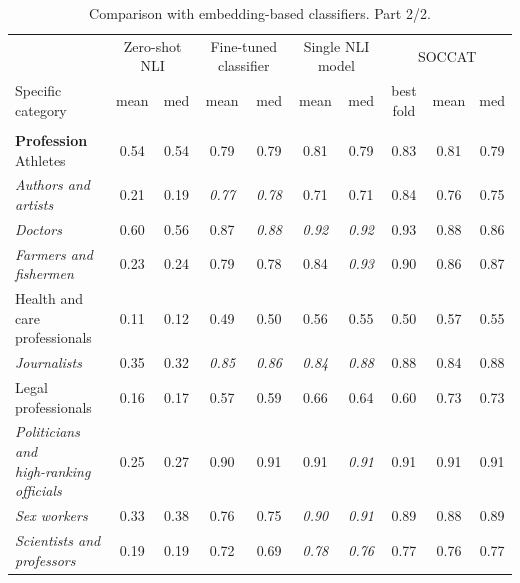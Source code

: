 \begin{table}[htb]
\centering
\renewcommand{\arraystretch}{0.9}
\scriptsize
\begin{threeparttable}
\caption{Comparison with embedding-based classifiers. Part 2/2.}
\label{tab:embedding_baselines_part2}
\begin{tabular}{l c c c c c c c c c}
\toprule
 & \multicolumn{2}{c}{Zero-shot NLI} & \multicolumn{2}{c}{Fine-tuned classifier} & \multicolumn{2}{c}{Single NLI model} & \multicolumn{3}{c}{SOCCAT} \\
\cmidrule(lr){2-3} \cmidrule(lr){4-5} \cmidrule(lr){6-7} \cmidrule(lr){8-10}
Specific category & \multicolumn{1}{c}{mean} & \multicolumn{1}{c}{med} & \multicolumn{1}{c}{mean} & \multicolumn{1}{c}{med} & \multicolumn{1}{c}{mean} & \multicolumn{1}{c}{med} & \multicolumn{1}{c}{best fold} & \multicolumn{1}{c}{mean} & \multicolumn{1}{c}{med} \\
\midrule
\rule{0pt}{5pt} &  &  &  &  &  &  &  &  &  \\
\shortstack[l]{\textbf{Profession}\\[3pt]Athletes} & 0.54 & 0.54 & 0.79 & 0.79 & 0.81 & 0.79 & 0.83 & 0.81 & 0.79 \\
\textit{Authors and artists} & 0.21 & 0.19 & \textit{0.77} & \textit{0.78} & 0.71 & 0.71 & 0.84 & 0.76 & 0.75 \\
\textit{Doctors} & 0.60 & 0.56 & 0.87 & \textit{0.88} & \textit{0.92} & \textit{0.92} & 0.93 & 0.88 & 0.86 \\
\textit{Farmers and fishermen} & 0.23 & 0.24 & 0.79 & 0.78 & 0.84 & \textit{0.93} & 0.90 & 0.86 & 0.87 \\
\shortstack[l]{Health and care\\[-3pt]professionals} & 0.11 & 0.12 & 0.49 & 0.50 & 0.56 & 0.55 & 0.50 & 0.57 & 0.55 \\
\textit{Journalists} & 0.35 & 0.32 & \textit{0.85} & \textit{0.86} & \textit{0.84} & \textit{0.88} & 0.88 & 0.84 & 0.88 \\
Legal professionals & 0.16 & 0.17 & 0.57 & 0.59 & 0.66 & 0.64 & 0.60 & 0.73 & 0.73 \\
\shortstack[l]{\textit{Politicians and}\\[-3pt]\textit{high-ranking officials}} & 0.25 & 0.27 & 0.90 & 0.91 & 0.91 & \textit{0.91} & 0.91 & 0.91 & 0.91 \\
\textit{Sex workers} & 0.33 & 0.38 & 0.76 & 0.75 & \textit{0.90} & \textit{0.91} & 0.89 & 0.88 & 0.89 \\
\shortstack[l]{\textit{Scientists and}\\[-3pt]\textit{professors}} & 0.19 & 0.19 & 0.72 & 0.69 & \textit{0.78} & \textit{0.76} & 0.77 & 0.76 & 0.77 \\

\end{tabular}
\end{threeparttable}
\end{table}
